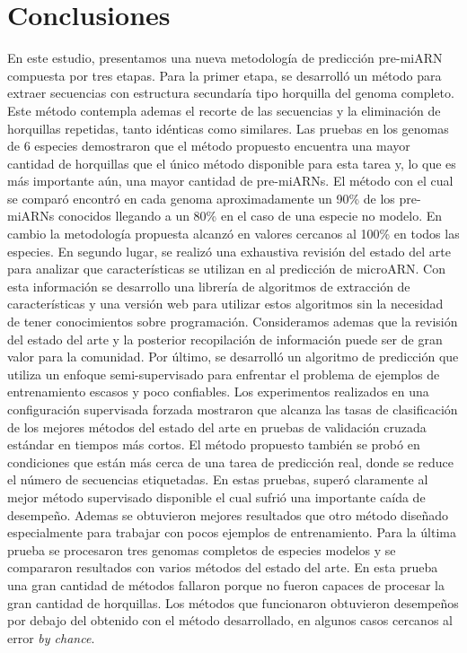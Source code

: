 \chapter{Conclusiones}
En este estudio, presentamos una nueva metodología de predicción pre-miARN compuesta por tres etapas. Para la primer etapa, se desarrolló un método para
extraer secuencias con estructura secundaría tipo horquilla del genoma completo. Este método contempla ademas el recorte de las secuencias y la eliminación
de horquillas repetidas, tanto idénticas como similares. Las pruebas en los genomas de 6 especies demostraron que el método propuesto encuentra una mayor
cantidad de horquillas que el único método disponible para esta tarea y, lo que es más importante aún, una mayor cantidad de pre-miARNs. El método con el
cual se comparó encontró en cada genoma aproximadamente un 90\% de los pre-miARNs conocidos llegando a un 80\% en el caso de una especie no modelo.
En cambio la metodología propuesta alcanzó en valores cercanos al 100\% en todos las especies.
En segundo lugar, se realizó una exhaustiva revisión del estado del arte para analizar que características se utilizan en al predicción de microARN. Con
esta información se desarrollo una librería de algoritmos de extracción de características y una versión web para utilizar estos
algoritmos sin la necesidad de tener conocimientos sobre programación. Consideramos ademas que la revisión del estado del arte y la posterior recopilación
de información puede ser de gran valor para la comunidad.
Por último, se desarrolló un algoritmo de predicción que utiliza un enfoque semi-supervisado para enfrentar el problema de ejemplos de entrenamiento escasos
y poco confiables. Los experimentos realizados en una configuración supervisada forzada mostraron que alcanza las tasas de clasificación de los mejores métodos
del estado del arte en pruebas de validación cruzada estándar en tiempos más cortos. El método propuesto también se probó en condiciones que están más
cerca de una tarea de predicción real, donde se reduce el número de secuencias etiquetadas. En estas pruebas, superó claramente al mejor método supervisado
disponible el cual sufrió una importante caída de desempeño. Ademas se obtuvieron mejores resultados que otro método diseñado especialmente para trabajar con
pocos ejemplos de entrenamiento. Para la última prueba se procesaron tres genomas completos de especies modelos y se compararon resultados con varios métodos del estado
del arte. En esta prueba una gran cantidad de métodos fallaron porque no fueron capaces de procesar la gran cantidad de horquillas. Los métodos que funcionaron
obtuvieron desempeños por debajo del obtenido con el método desarrollado, en algunos casos cercanos al error \textit{by chance}.



